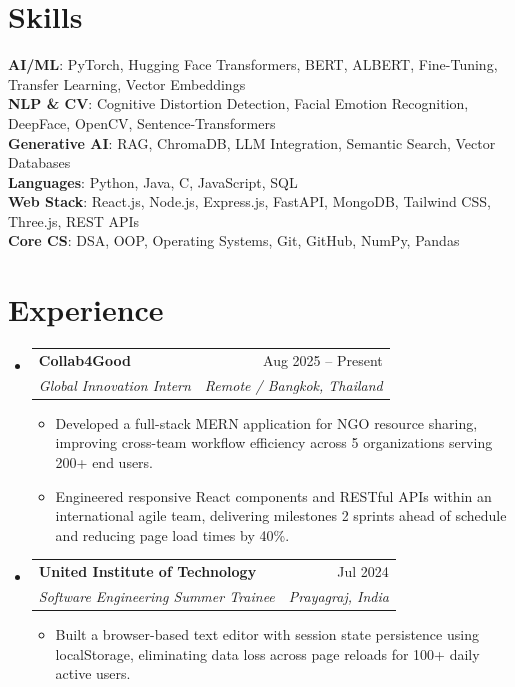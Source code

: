 \documentclass[letterpaper,10pt]{article}
\makeatletter
\newcommand{\resumeItem}[1]{\item\small{#1 \vspace{-2pt}}}
\newcommand{\resumeSubheading}[4]{
  \vspace{-3pt}\item
    \begin{tabular*}{\linewidth}[t]{l@{\extracolsep{\fill}}r}
      \textbf{#1} & #2 \\
      \textit{\small#3} & \textit{\small #4} \\
    \end{tabular*}\vspace{-7pt}
}
\newcommand{\resumeSubHeadingListStart}{\begin{itemize}[leftmargin=0.15in, label={}]}
\newcommand{\resumeSubHeadingListEnd}{\end{itemize}\vspace{-5pt}}
\newcommand{\resumeItemListStart}{\begin{itemize}[leftmargin=0.2in, label={$\bullet$}]}
\newcommand{\resumeItemListEnd}{\end{itemize}\vspace{-4pt}}
\makeatother
\begin{document}
\section{Skills}
 \begin{itemize}[leftmargin=0.15in, label={}]
    \small{\item{
     \textbf{AI/ML}{: PyTorch, Hugging Face Transformers, BERT, ALBERT, Fine-Tuning, Transfer Learning, Vector Embeddings} \\
     \textbf{NLP \& CV}{: Cognitive Distortion Detection, Facial Emotion Recognition, DeepFace, OpenCV, Sentence-Transformers} \\
     \textbf{Generative AI}{: RAG, ChromaDB, LLM Integration, Semantic Search, Vector Databases} \\
     \textbf{Languages}{: Python, Java, C, JavaScript, SQL} \\
     \textbf{Web Stack}{: React.js, Node.js, Express.js, FastAPI, MongoDB, Tailwind CSS, Three.js, REST APIs} \\
     \textbf{Core CS}{: DSA, OOP, Operating Systems, Git, GitHub, NumPy, Pandas}
    }}
 \end{itemize}
 \vspace{-8pt}

\section{Experience}
  \resumeSubHeadingListStart
    \resumeSubheading
      {Collab4Good}{Aug 2025 -- Present}
      {Global Innovation Intern}{Remote / Bangkok, Thailand}
      \resumeItemListStart
        \resumeItem{Developed a full-stack MERN application for NGO resource sharing, improving cross-team workflow efficiency across 5 organizations serving 200+ end users.}
        \resumeItem{Engineered responsive React components and RESTful APIs within an international agile team, delivering milestones 2 sprints ahead of schedule and reducing page load times by 40\%.}
      \resumeItemListEnd

    \resumeSubheading
      {United Institute of Technology}{Jul 2024}
      {Software Engineering Summer Trainee}{Prayagraj, India}
      \resumeItemListStart
        \resumeItem{Built a browser-based text editor with session state persistence using localStorage, eliminating data loss across page reloads for 100+ daily active users.}
      \resumeItemListEnd
  \resumeSubHeadingListEnd

\end{document}
